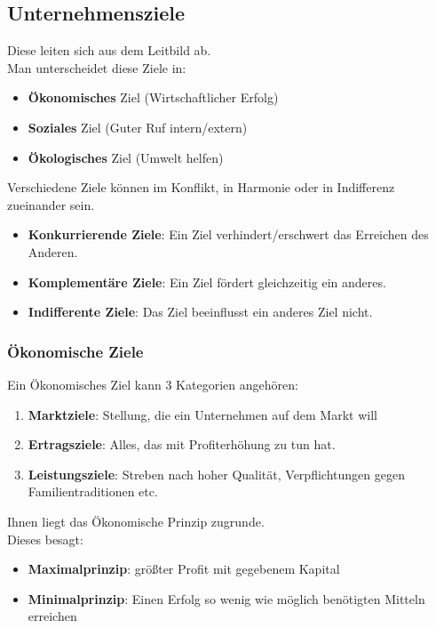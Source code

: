 \documentclass[10pt]{article}
\begin{document}
\break

\subsection{Unternehmensziele}
Diese leiten sich aus dem Leitbild ab. \\
Man unterscheidet diese Ziele in:
\begin{itemize}
\item \textbf{Ökonomisches} Ziel (Wirtschaftlicher Erfolg)
\item \textbf{Soziales} Ziel (Guter Ruf intern/extern)
\item \textbf{Ökologisches} Ziel (Umwelt helfen)
\end{itemize}
Verschiedene Ziele können im Konflikt, in Harmonie oder in Indifferenz zueinander sein.  \\
\begin{itemize}
\item \textbf{Konkurrierende Ziele}: Ein Ziel verhindert/erschwert das Erreichen des Anderen.
\item \textbf{Komplementäre Ziele}: Ein Ziel fördert gleichzeitig ein anderes.
\item \textbf{Indifferente Ziele}: Das Ziel beeinflusst ein anderes Ziel nicht.
\end{itemize}

\subsubsection{Ökonomische Ziele}
Ein Ökonomisches Ziel kann 3 Kategorien angehören: \\
\begin{enumerate}
\item \textbf{Marktziele}: Stellung, die ein Unternehmen auf dem Markt will
\item \textbf{Ertragsziele}: Alles, das mit Profiterhöhung zu tun hat.
\item \textbf{Leistungsziele}: Streben  nach hoher Qualität, Verpflichtungen gegen Familientraditionen etc. \\
\end{enumerate}
Ihnen liegt das Ökonomische Prinzip zugrunde. \\
Dieses besagt: \\
\begin{itemize}
\item \textbf{Maximalprinzip}: größter  Profit mit gegebenem Kapital
\item \textbf{Minimalprinzip}: Einen Erfolg so wenig wie möglich benötigten Mitteln erreichen
\end{itemize}
\end{document}
